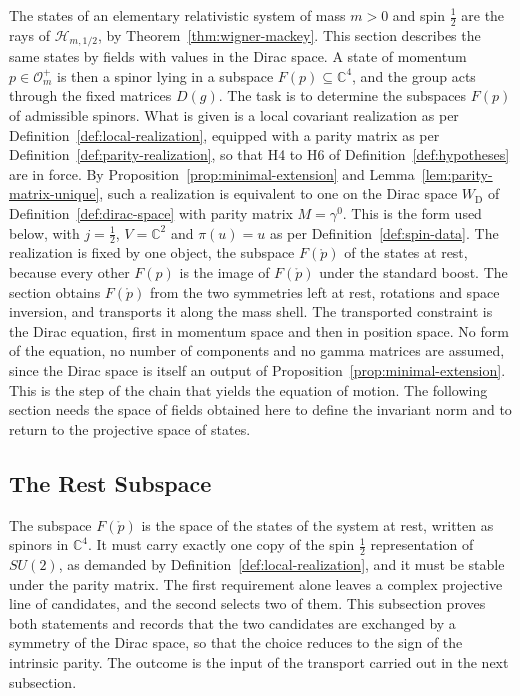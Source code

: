 The states of an elementary relativistic system of mass $m>0$ and spin $\frac12$ are the rays of $\mathcal{H}_{m,1/2}$, by Theorem~\ref{thm:wigner-mackey}. This section describes the same states by fields with values in the Dirac space. A state of momentum $p\in\mathcal{O}_m^+$ is then a spinor lying in a subspace $F(p)\subseteq\mathbb{C}^4$, and the group acts through the fixed matrices $D(g)$. The task is to determine the subspaces $F(p)$ of admissible spinors. What is given is a local covariant realization as per Definition~\ref{def:local-realization}, equipped with a parity matrix as per Definition~\ref{def:parity-realization}, so that H4 to H6 of Definition~\ref{def:hypotheses} are in force. By Proposition~\ref{prop:minimal-extension} and Lemma~\ref{lem:parity-matrix-unique}, such a realization is equivalent to one on the Dirac space $W_{\mathrm{D}}$ of Definition~\ref{def:dirac-space} with parity matrix $M=\gamma^0$. This is the form used below, with $j=\frac12$, $V=\mathbb{C}^2$ and $\pi(u)=u$ as per Definition~\ref{def:spin-data}. The realization is fixed by one object, the subspace $F(\mathring{p})$ of the states at rest, because every other $F(p)$ is the image of $F(\mathring{p})$ under the standard boost. The section obtains $F(\mathring{p})$ from the two symmetries left at rest, rotations and space inversion, and transports it along the mass shell. The transported constraint is the Dirac equation, first in momentum space and then in position space. No form of the equation, no number of components and no gamma matrices are assumed, since the Dirac space is itself an output of Proposition~\ref{prop:minimal-extension}. This is the step of the chain that yields the equation of motion. The following section needs the space of fields obtained here to define the invariant norm and to return to the projective space of states.

\subsection{The Rest Subspace}\label{sec:rest}

The subspace $F(\mathring{p})$ is the space of the states of the system at rest, written as spinors in $\mathbb{C}^4$. It must carry exactly one copy of the spin $\frac12$ representation of $SU(2)$, as demanded by Definition~\ref{def:local-realization}, and it must be stable under the parity matrix. The first requirement alone leaves a complex projective line of candidates, and the second selects two of them. This subsection proves both statements and records that the two candidates are exchanged by a symmetry of the Dirac space, so that the choice reduces to the sign of the intrinsic parity. The outcome is the input of the transport carried out in the next subsection.

